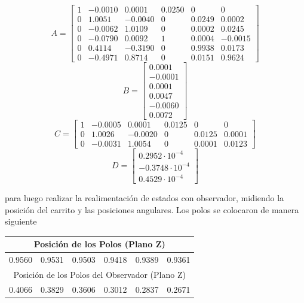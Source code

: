 \begin{equation}
 A = \begin{bmatrix}
1 &  -0.0010  & 0.0001 & 0.0250 &  0      & 0\\
0 &  1.0051  & -0.0040 & 0     &  0.0249 & 0.0002\\
0 &  -0.0062 & 1.0109  & 0     &  0.0002 & 0.0245\\
0 &  -0.0790  & 0.0092 & 1     &  0.0004 & -0.0015\\
0 &  0.4114  & -0.3190 & 0     &  0.9938 & 0.0173\\
0 &  -0.4971 & 0.8714 & 0     &  0.0151 & 0.9624
\end{bmatrix}
\end{equation}
\begin{equation}
 B = \begin{bmatrix}
0.0001 \\
-0.0001 \\
0.0001 \\
0.0047 \\
-0.0060 \\
0.0072
\end{bmatrix}
\end{equation}
\begin{equation}
 C = \begin{bmatrix}
1 &  -0.0005  & 0.0001 & 0.0125 &  0      & 0\\
0 &  1.0026  & -0.0020 & 0     &  0.0125 & 0.0001\\
0 &  -0.0031 & 1.0054  & 0     &  0.0001 & 0.0123
\end{bmatrix}
\end{equation}
\begin{equation}
 D = \begin{bmatrix}
0.2952 \cdot 10^{-4} \\
-0.3748 \cdot 10^{-4} \\
0.4529  \cdot 10^{-4}
\end{bmatrix}
\end{equation}

para luego realizar la realimentación de estados con observador, midiendo la posición del carrito y las posiciones angulares. Los polos se colocaron de manera siguiente

\begin{table}[H]
\centering
\begin{tabular}{@{}cccccc@{}}
\toprule
\multicolumn{6}{c}{Posición de los Polos (Plano Z)}                \\ \midrule
0.9560    & 0.9531    & 0.9503    & 0.9418   & 0.9389   & 0.9361   \\ \midrule
\multicolumn{6}{c}{Posición de los Polos del Observador (Plano Z)} \\ \midrule
0.4066    & 0.3829    & 0.3606    & 0.3012   & 0.2837   & 0.2671   \\ \bottomrule
\end{tabular}
\end{table}

